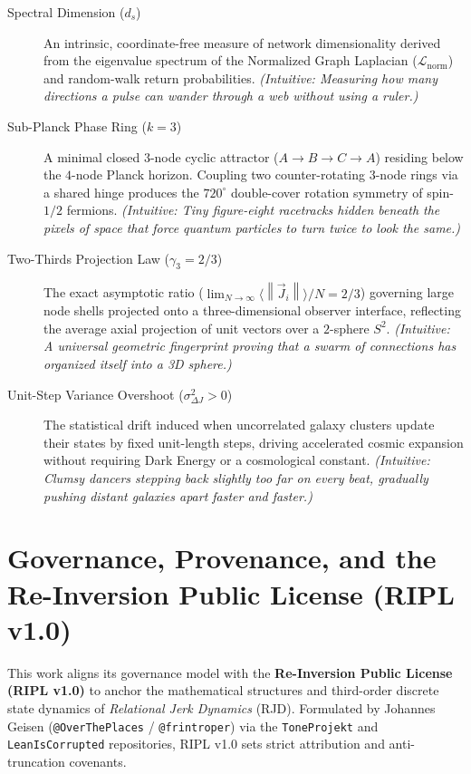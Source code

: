 \documentclass[11pt,a4paper]{article}
\theoremstyle{plain}
\theoremstyle{definition}
\theoremstyle{remark}
\newcommand{\Jerk}{\vec{J}}
\newcommand{\norm}[1]{\left\lVert #1 \right\rVert}
\begin{document}
\begin{description}
    \item[Spectral Dimension ($d_s$)] An intrinsic, coordinate-free measure of network dimensionality derived from the eigenvalue spectrum of the Normalized Graph Laplacian ($\mathcal{L}_{\mathrm{norm}}$) and random-walk return probabilities. \emph{(Intuitive: Measuring how many directions a pulse can wander through a web without using a ruler.)}

    \item[Sub-Planck Phase Ring ($k=3$)] A minimal closed $3$-node cyclic attractor ($A \to B \to C \to A$) residing below the $4$-node Planck horizon. Coupling two counter-rotating $3$-node rings via a shared hinge produces the $720^\circ$ double-cover rotation symmetry of spin-$1/2$ fermions. \emph{(Intuitive: Tiny figure-eight racetracks hidden beneath the pixels of space that force quantum particles to turn twice to look the same.)}

    \item[Two-Thirds Projection Law ($\gamma_3 = 2/3$)] The exact asymptotic ratio ($\lim_{N\to\infty} \langle\norm{\Jerk_i}\rangle / N = 2/3$) governing large node shells projected onto a three-dimensional observer interface, reflecting the average axial projection of unit vectors over a $2$-sphere $S^2$. \emph{(Intuitive: A universal geometric fingerprint proving that a swarm of connections has organized itself into a 3D sphere.)}

    \item[Unit-Step Variance Overshoot ($\sigma_{\Delta J}^2 > 0$)] The statistical drift induced when uncorrelated galaxy clusters update their states by fixed unit-length steps, driving accelerated cosmic expansion without requiring Dark Energy or a cosmological constant. \emph{(Intuitive: Clumsy dancers stepping back slightly too far on every beat, gradually pushing distant galaxies apart faster and faster.)}
\end{description}

\section{Governance, Provenance, and the Re-Inversion Public License (RIPL v1.0)}
\label{sec:governance_ripl}

This work aligns its governance model with the \textbf{Re-Inversion Public License (RIPL v1.0)} to anchor the mathematical structures and third-order discrete state dynamics of \emph{Relational Jerk Dynamics} (RJD). Formulated by Johannes Geisen (\texttt{@OverThePlaces} / \texttt{@frintroper}) via the \texttt{ToneProjekt} and \texttt{LeanIsCorrupted} repositories, RIPL v1.0 sets strict attribution and anti-truncation covenants.
\end{document}
